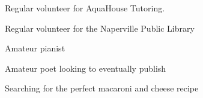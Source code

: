 \documentclass[10.5pt, letterpaper]{article}
\begin{document}
\begin{center}
	\begin{multicols}{2}
		\begin{description}
			\item Regular volunteer for AquaHouse Tutoring.  
			\item Regular volunteer for the Naperville Public Library
			\item Amateur pianist
			\item Amateur poet looking to eventually publish
			\item Searching for the perfect macaroni and cheese recipe
		\end{description}
	\end{multicols}
\end{center}
\end{document}
